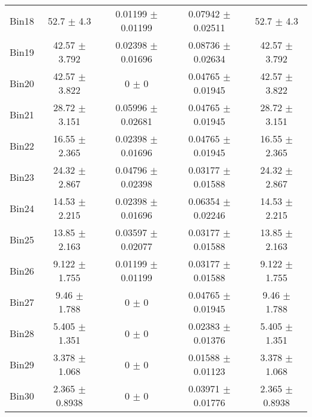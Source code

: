 \begin{tabular}{@{\extracolsep{4pt}}lcccc@{}}
     Bin18 & 52.7 $\pm$ 4.3 & 0.01199 $\pm$ 0.01199 & 0.07942 $\pm$ 0.02511 & 52.7 $\pm$ 4.3 \\ 
     Bin19 & 42.57 $\pm$ 3.792 & 0.02398 $\pm$ 0.01696 & 0.08736 $\pm$ 0.02634 & 42.57 $\pm$ 3.792 \\ 
     Bin20 & 42.57 $\pm$ 3.822 & 0 $\pm$ 0 & 0.04765 $\pm$ 0.01945 & 42.57 $\pm$ 3.822 \\ 
     Bin21 & 28.72 $\pm$ 3.151 & 0.05996 $\pm$ 0.02681 & 0.04765 $\pm$ 0.01945 & 28.72 $\pm$ 3.151 \\ 
     Bin22 & 16.55 $\pm$ 2.365 & 0.02398 $\pm$ 0.01696 & 0.04765 $\pm$ 0.01945 & 16.55 $\pm$ 2.365 \\ 
     Bin23 & 24.32 $\pm$ 2.867 & 0.04796 $\pm$ 0.02398 & 0.03177 $\pm$ 0.01588 & 24.32 $\pm$ 2.867 \\ 
     Bin24 & 14.53 $\pm$ 2.215 & 0.02398 $\pm$ 0.01696 & 0.06354 $\pm$ 0.02246 & 14.53 $\pm$ 2.215 \\ 
     Bin25 & 13.85 $\pm$ 2.163 & 0.03597 $\pm$ 0.02077 & 0.03177 $\pm$ 0.01588 & 13.85 $\pm$ 2.163 \\ 
     Bin26 & 9.122 $\pm$ 1.755 & 0.01199 $\pm$ 0.01199 & 0.03177 $\pm$ 0.01588 & 9.122 $\pm$ 1.755 \\ 
     Bin27 & 9.46 $\pm$ 1.788 & 0 $\pm$ 0 & 0.04765 $\pm$ 0.01945 & 9.46 $\pm$ 1.788 \\ 
     Bin28 & 5.405 $\pm$ 1.351 & 0 $\pm$ 0 & 0.02383 $\pm$ 0.01376 & 5.405 $\pm$ 1.351 \\ 
     Bin29 & 3.378 $\pm$ 1.068 & 0 $\pm$ 0 & 0.01588 $\pm$ 0.01123 & 3.378 $\pm$ 1.068 \\ 
     Bin30 & 2.365 $\pm$ 0.8938 & 0 $\pm$ 0 & 0.03971 $\pm$ 0.01776 & 2.365 $\pm$ 0.8938 \\ 
\hline\hline
  \end{tabular}
